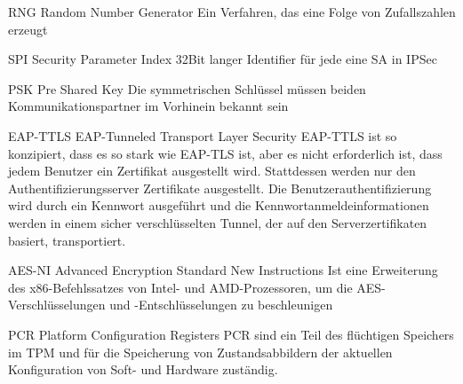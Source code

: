 {RNG}
{Random Number Generator}
{
	Ein Verfahren, das eine Folge von Zufallszahlen erzeugt
}

{SPI}
{Security Parameter Index}
{
	32Bit langer Identifier für jede eine SA in IPSec
}

{PSK}
{Pre Shared Key}
{
	Die symmetrischen Schlüssel müssen beiden Kommunikationspartner im Vorhinein bekannt sein
}

{EAP-TTLS}
{EAP-Tunneled Transport Layer Security}
{
	EAP-TTLS ist so konzipiert, dass es so stark wie EAP-TLS ist, aber es nicht erforderlich ist, dass jedem Benutzer ein Zertifikat ausgestellt wird. Stattdessen werden nur den Authentifizierungsserver Zertifikate ausgestellt. Die Benutzerauthentifizierung wird durch ein Kennwort ausgeführt und die Kennwortanmeldeinformationen werden in einem sicher verschlüsselten Tunnel, der auf den Serverzertifikaten basiert, transportiert.
}

{AES-NI}
{Advanced Encryption Standard New Instructions}
{
	Ist eine Erweiterung des x86-Befehlssatzes von Intel- und AMD-Prozessoren, um die AES-Verschlüsselungen und -Entschlüsselungen zu beschleunigen
}

{PCR}
{Platform Configuration Registers}
{
	PCR sind ein Teil des flüchtigen Speichers im TPM und für die Speicherung von Zustandsabbildern der aktuellen Konfiguration von Soft- und Hardware zuständig.
}



